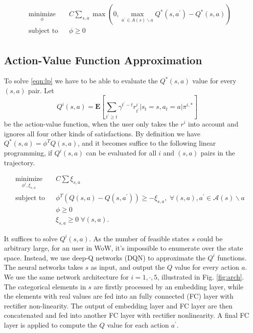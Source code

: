 \documentclass[a4paper]{article}
\begin{document}
\begin{equation*}
\begin{aligned}
& \underset{\phi}{\text{minimize}}
& & C\sum_{s,a} \max(0, \max_{a^\prime \in A(s)\backslash a}Q^\ast(s,a^\prime) - Q^\ast(s,a))\\
& \text{subject to}
& & \phi \geq 0 \; \\
\label{eqn:raw_lp}
\end{aligned}
\end{equation*}


\subsection{Action-Value Function Approximation}

To solve \ref{eqn:lp} we have to be able to evaluate the $Q^*(s,a)$ value for every $(s,a)$ pair. Let
$$Q^i(s,a)=\mathbf{E}[\sum_{t^\prime\geq t}\gamma^{t^\prime-t}r^i_{t^\prime} | s_{t}=s, a_{t}=a | \pi^{i,\ast}] \label{eqn:qi}$$
be the action-value function, when the user only takes the $r^i$ into account and ignores all four other kinds of satisfactions. By definition we have $Q^*(s,a)=\phi^TQ(s,a)$, and it becomes suffice to the following linear programming, if $Q^i(s,a)$ can be evaluated for all $i$ and $(s,a)$ pairs in the trajectory.

\begin{equation*}
\begin{aligned}
& \underset{\phi^i, \xi_{s,a}}{\text{minimize}}
& & C\sum \xi_{s,a} \\
& \text{subject to}
& & \phi^T(Q(s,a)-Q(s,a^\prime)) \geq - \xi_{s,a}, \; \forall (s,a), a^\prime \in \mathcal{A}(s)\backslash a \\
&&& \phi \geq 0 \; \\
&&& \xi_{s,a} \geq 0 \; \forall (s,a).
\label{eqn:lp}
\end{aligned}
\end{equation*}

It suffices to solve $Q^i(s,a)$. As the number of feasible states $s$ could be arbitrary large, for an user in WoW, it's impossible to enumerate over the state space. Instead, we use deep-Q networks (DQN) \cite{} to approximate the $Q^i$ functions. The neural networks takes $s$ as input, and output the $Q$ value for every action $a$. We use the same network architecture for $i=1,\cdot,5$, illustrated in Fig. \ref{fig:arch}. The categorical elements in $s$ are firstly processed by an embedding layer, while the elements with real values are fed into an fully connected (FC) layer with rectifier non-linearity. The output of embedding layer and FC layer are then concatenated and fed into another FC layer with rectifier nonlinearity. A final FC layer is applied to compute the $Q$ value for each action $a^\prime$.
\end{document}
